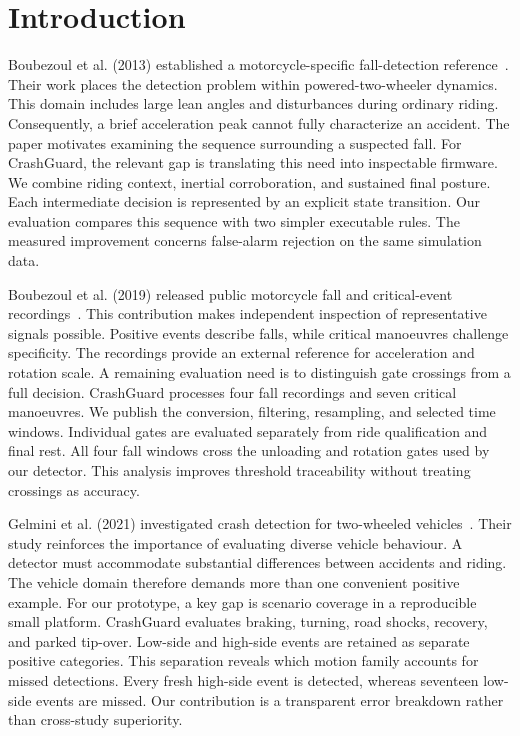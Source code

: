 \documentclass[10pt,a4paper]{article}
\begin{document}
\section{Introduction}
Boubezoul et al. (2013) established a motorcycle-specific fall-detection reference~\cite{boubezoul2013algorithm}. Their work places the detection problem within powered-two-wheeler dynamics. This domain includes large lean angles and disturbances during ordinary riding. Consequently, a brief acceleration peak cannot fully characterize an accident. The paper motivates examining the sequence surrounding a suspected fall. For CrashGuard, the relevant gap is translating this need into inspectable firmware. We combine riding context, inertial corroboration, and sustained final posture. Each intermediate decision is represented by an explicit state transition. Our evaluation compares this sequence with two simpler executable rules. The measured improvement concerns false-alarm rejection on the same simulation data.


Boubezoul et al. (2019) released public motorcycle fall and critical-event recordings~\cite{boubezoul2019dataset}. This contribution makes independent inspection of representative signals possible. Positive events describe falls, while critical manoeuvres challenge specificity. The recordings provide an external reference for acceleration and rotation scale. A remaining evaluation need is to distinguish gate crossings from a full decision. CrashGuard processes four fall recordings and seven critical manoeuvres. We publish the conversion, filtering, resampling, and selected time windows. Individual gates are evaluated separately from ride qualification and final rest. All four fall windows cross the unloading and rotation gates used by our detector. This analysis improves threshold traceability without treating crossings as accuracy.


Gelmini et al. (2021) investigated crash detection for two-wheeled vehicles~\cite{gelmini2021novel}. Their study reinforces the importance of evaluating diverse vehicle behaviour. A detector must accommodate substantial differences between accidents and riding. The vehicle domain therefore demands more than one convenient positive example. For our prototype, a key gap is scenario coverage in a reproducible small platform. CrashGuard evaluates braking, turning, road shocks, recovery, and parked tip-over. Low-side and high-side events are retained as separate positive categories. This separation reveals which motion family accounts for missed detections. Every fresh high-side event is detected, whereas seventeen low-side events are missed. Our contribution is a transparent error breakdown rather than cross-study superiority.
\end{document}
